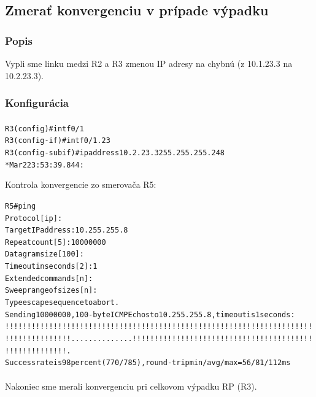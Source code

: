 \documentclass[12pt,twoside,a4paper]{report}
\begin{document}
\subsection{Zmerať konvergenciu v prípade výpadku}
\subsubsection{Popis}
Vypli sme linku  medzi R2 a R3 zmenou IP adresy na chybnú (z 10.1.23.3 na 10.2.23.3).

\subsubsection{Konfigurácia}
\paragraph{}

\noindent
{\selectfont
\begin{small}
\begin{alltt}
R3(config)#int f0/1 
R3(config-if)#int f0/1.23     
R3(config-subif)#ip address 10.2.23.3 255.255.255.248
*Mar  2 23:53:39.844: %

\end{alltt}
\end{small}
}


Kontrola konvergencie zo smerovača R5:

\noindent
{\selectfont
\begin{small}
\begin{alltt}

R5#ping        
Protocol [ip]:             
Target IP address: 10.255.255.8
Repeat count [5]: 10000000    
Datagram size [100]:
Timeout in seconds [2]: 1           
Extended commands [n]:
Sweep range of sizes [n]:
Type escape sequence to abort.
Sending 10000000, 100-byte ICMP Echos to 10.255.255.8, timeout is 1 seconds:
!!!!!!!!!!!!!!!!!!!!!!!!!!!!!!!!!!!!!!!!!!!!!!!!!!!!!!!!!!!!!!!!!!!!!!
!!!!!!!!!!!!!!!..............!!!!!!!!!!!!!!!!!!!!!!!!!!!!!!!!!!!!!!!!!
!!!!!!!!!!!!!!.
Success rate is 98 percent (770/785), round-trip min/avg/max = 56/81/112 ms

\end{alltt}
\end{small}
}

\paragraph{}
Nakoniec sme merali konvergenciu pri celkovom výpadku RP (R3).
\end{document}

